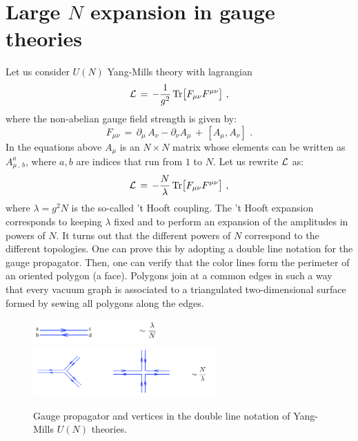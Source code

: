 \documentclass[12pt,notitlepage,a4paper]{article}
\newcommand{\beq}{\begin{equation}}
\newcommand{\eeq}{\end{equation}}
\begin{document}
\section{Large $N$ expansion in gauge theories}
Let us consider $U(N)$  Yang-Mills theory with lagrangian
\beq
{\cal L}\,=\,-{1\over g^2}\,{\rm Tr}\big[ F_{\mu\nu} F^{\mu\nu}\big]\,\,,
\eeq
where the non-abelian gauge field strength is given by:
\beq
F_{\mu\nu}\,=\,\partial_{\mu}\,A_{\nu}-\partial_{\nu} A_{\mu}\,+\,
[A_{\mu}, A_{\nu}]\,\,.
\eeq
In the equations above $A_{\mu}$ is an $N\times N$ matrix whose elements can be written as $A_{\mu\,,\,b}^{a}$, where $a,b$ are indices that run from $1$ to $N$. Let us rewrite ${\cal L}$ as:
\beq
{\cal L}\,=\,-{N\over \lambda}\,{\rm Tr}\big[ F_{\mu\nu} F^{\mu\nu}\big]\,\,,
\eeq
where $\lambda=g^2 N$ is the so-called 't Hooft coupling. The  't Hooft  expansion \cite{tHooft:1973jz} corresponds to keeping $\lambda$ fixed and to perform an expansion of the amplitudes in powers of $N$. It turns out that the different powers of $N$ correspond to the different topologies. One can prove this by
adopting a double line notation for the gauge propagator. Then, one can verify that 
the color lines form the perimeter of an oriented polygon (a face). 
Polygons join at  a common edges in such a way that every vacuum 
graph is associated to a  triangulated two-dimensional surface formed by sewing all polygons along the edges. 

\begin{figure}[ht]
\center
\includegraphics[width=0.43\textwidth]{gauge_propagator.pdf}
\qquad\qquad
\includegraphics[width=0.63\textwidth]{YMvertices.pdf}
\caption{Gauge propagator and vertices in the double line notation of Yang-Mills  $U(N)$ theories. } 
\label{largeNYM.pdf}
\end{figure}
\end{document}
